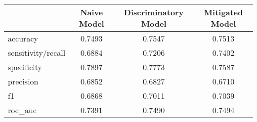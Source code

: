\begin{tabular}{lccc}
\toprule
{} &  Naive Model &  Discriminatory Model &  Mitigated Model \\
\midrule
accuracy           &       0.7493 &                0.7547 &           0.7513 \\
sensitivity/recall &       0.6884 &                0.7206 &           0.7402 \\
specificity        &       0.7897 &                0.7773 &           0.7587 \\
precision          &       0.6852 &                0.6827 &           0.6710 \\
f1                 &       0.6868 &                0.7011 &           0.7039 \\
roc\_auc            &       0.7391 &                0.7490 &           0.7494 \\
\bottomrule
\end{tabular}
